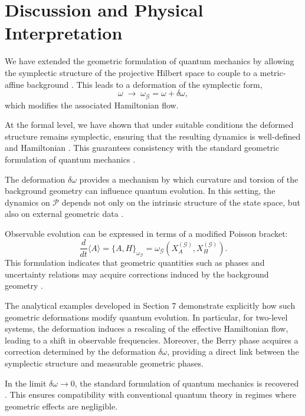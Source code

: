 \documentclass[11pt, a4paper]{article}
\begin{document}
\section{Discussion and Physical Interpretation}

We have extended the geometric formulation of quantum mechanics by allowing
the symplectic structure of the projective Hilbert space to couple to a
metric-affine background \cite{hehl1995,shapiro2002}. This leads to a
deformation of the symplectic form,
\[
\omega \;\longrightarrow\; \omega_{\mathcal{G}} = \omega + \delta\omega,
\]
which modifies the associated Hamiltonian flow.

At the formal level, we have shown that under suitable conditions the
deformed structure remains symplectic, ensuring that the resulting dynamics
is well-defined and Hamiltonian \cite{deGosson2011}. This guarantees
consistency with the standard geometric formulation of quantum mechanics
\cite{kibble1979,anandan1990}.

The deformation $\delta\omega$ provides a mechanism by which curvature
and torsion of the background geometry can influence quantum evolution.
In this setting, the dynamics on $\mathcal{P}$ depends not only on the
intrinsic structure of the state space, but also on external geometric data
\cite{poplawski2010}.

Observable evolution can be expressed in terms of a modified Poisson bracket:
\begin{equation}
\frac{d}{dt} \langle A \rangle
= \{A, H\}_{\omega_{\mathcal{G}}}
= \omega_{\mathcal{G}}(X_A^{(\mathcal{G})}, X_H^{(\mathcal{G})}).
\end{equation}
This formulation indicates that geometric quantities such as phases and
uncertainty relations may acquire corrections induced by the background
geometry \cite{berry1984,simon1983,andersson2014}.

The analytical examples developed in Section 7 demonstrate explicitly how
such geometric deformations modify quantum evolution. In particular, for
two-level systems, the deformation induces a rescaling of the effective
Hamiltonian flow, leading to a shift in observable frequencies. Moreover,
the Berry phase acquires a correction determined by the deformation
$\delta\omega$, providing a direct link between the symplectic structure
and measurable geometric phases.

In the limit $\delta\omega \to 0$, the standard formulation of quantum
mechanics is recovered \cite{dirac1958}. This ensures compatibility with
conventional quantum theory in regimes where geometric effects are negligible.
\end{document}
